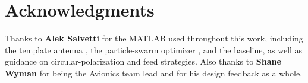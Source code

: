 %
%
%
%

\chapter*{Acknowledgments}

Thanks to \textbf{Alek Salvetti} for the MATLAB used throughout this work, including the template antenna , the particle-swarm optimizer , and the  baseline, as well as guidance on circular-polarization and feed strategies. Also thanks to \textbf{Shane Wyman} for being the Avionics team lead and for his design feedback as a whole.

\vspace{1em}



